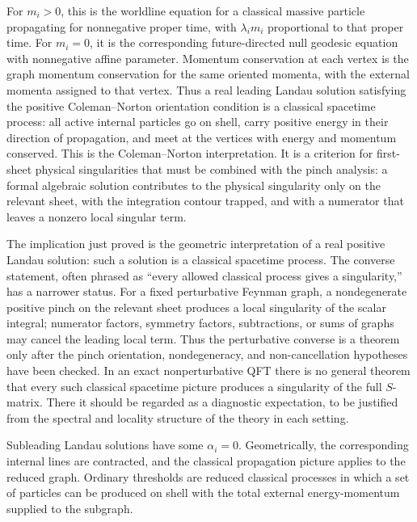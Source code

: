 For \(m_i>0\), this is the worldline equation for a classical massive particle
propagating for nonnegative proper time, with \(\lambda_i m_i\) proportional to
that proper time.  For \(m_i=0\), it is the corresponding future-directed null
geodesic equation with nonnegative affine parameter.  Momentum conservation at
each vertex is the graph momentum conservation for the same oriented momenta,
with the external momenta assigned to that vertex.  Thus a real leading Landau
solution satisfying the positive Coleman--Norton orientation condition is a
classical spacetime process: all active internal particles go on shell, carry
positive energy in their direction of propagation, and meet at the vertices
with energy and momentum conserved.  This is the Coleman--Norton
interpretation.  It is a criterion for first-sheet physical singularities that
must be combined with the pinch analysis: a formal algebraic solution
contributes to the physical singularity only on the relevant sheet, with the
integration contour trapped, and with a numerator that leaves a nonzero local
singular term.

\begin{warning}
The implication just proved is the geometric interpretation of a real positive
Landau solution: such a solution is a classical spacetime process.  The
converse statement, often phrased as ``every allowed classical process gives a
singularity,'' has a narrower status.  For a fixed perturbative Feynman graph,
a nondegenerate positive pinch on the relevant sheet produces a local
singularity of the scalar integral; numerator factors, symmetry factors,
subtractions, or sums of graphs may cancel the leading local term.  Thus the
perturbative converse is a theorem only after the pinch orientation,
nondegeneracy, and non-cancellation hypotheses have been checked.  In an exact
nonperturbative QFT there is no general theorem that every such classical
spacetime picture produces a singularity of the full \(S\)-matrix.  There it
should be regarded as a diagnostic expectation, to be justified from the
spectral and locality structure of the theory in each setting.
\end{warning}

Subleading Landau solutions have some \(\alpha_i=0\).  Geometrically, the
corresponding internal lines are contracted, and the classical propagation
picture applies to the reduced graph.  Ordinary thresholds are reduced
classical processes in which a set of particles can be produced on shell with
the total external energy-momentum supplied to the subgraph.

